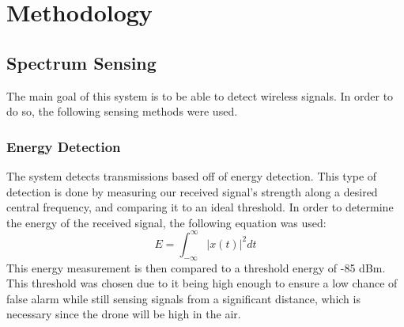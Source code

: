 \chapter{Methodology}
\section{Spectrum Sensing} \label{methods:processing}
The main goal of this system is to be able to detect wireless signals. In order to do so, the following sensing methods were used.
\subsection{Energy Detection}
The system detects transmissions based off of energy detection. This type of detection is done by measuring our received signal’s strength along a desired central frequency, and comparing it to an ideal threshold. In order to determine the energy of the received signal, the following equation was used:
\[E = \int_{-\infty}^{\infty}| x(t) |^2dt\]
This energy measurement is then compared to a threshold energy of -85 dBm. This threshold was chosen due to it being high enough to ensure a low chance of false alarm while still sensing signals from a significant distance, which is necessary since the drone will be high in the air. \par

